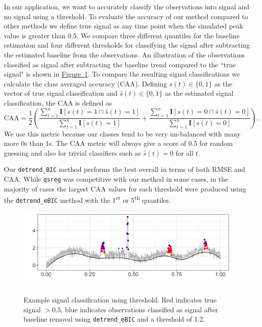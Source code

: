 \documentclass[12pt]{article}
\newcommand{\Fig}[1]{\hyperref[fig:#1]{Figure~\ref*{fig:#1}}} %
\newcommand{\Fig}[1]{{Figure~\ref{fig:#1}}} %
\begin{document}
	In our application, we want to accurately classify the observations into signal and no signal using a threshold. To evaluate the accuracy of our method compared to other methods we define true signal as any time point when the simulated peak value is greater than 0.5. We compare three different quantiles for the baseline estimation and four different thresholds for classifying the signal after subtracting the estimated baseline from the observations.  An illustration of the observations classified as signal after subtracting the baseline trend compared to the ``true signal" is shown in \Fig{peaks_class_eg}. To compare the resulting signal classifications we calculate the class averaged accuracy (CAA). Defining $s(t) \in \{0,1\}$ as the vector of true signal classification and $\hat{s}(t) \in \{0,1\}$ as the estimated signal classification, the CAA is defined as
	\begin{equation}
	\mbox{CAA} = \frac{1}{2}\left(\frac{\sum_{t=1}^n \mathbf{I}[s(t) = 1 \cap \hat{s}(t)=1]}{\sum_{t=1}^n \mathbf{I}[s(t) = 1]} + \frac{\sum_{t=1}^n \mathbf{I}[s(t) = 0 \cap \hat{s}(t)=0]}{\sum_{t=1}^n \mathbf{I}[s(t) = 0]}\right).
	\end{equation}  
	We use this metric because our classes tend to be very un-balanced with many more $0$s than $1$s. The CAA metric will always give a score of 0.5 for random guessing and also for trivial classifiers such as $\hat{s}(t) = 0$ for all $t$. 

	Our \texttt{detrend\_BIC} method performs the best overall in terms of both RMSE and CAA. While \texttt{qsreg} was competitive with our method in some cases, in the majority of cases the largest CAA values for each threshold were produced using the \texttt{detrend\_eBIC} method with the 1\textsuperscript{st} or 5\textsuperscript{th} quantiles. 
	
	\begin{figure}[h!]
		\caption{Example signal classification using threshold. Red indicates true signal $>0.5$, blue indicates observations classified as signal after baseline removal using \texttt{detrend\_eBIC} and a threshold of 1.2.}
		\includegraphics[width = \linewidth]{Figures/peaks_eg_class.png}
		\label{fig:peaks_class_eg}
	\end{figure}
	
\end{document}
